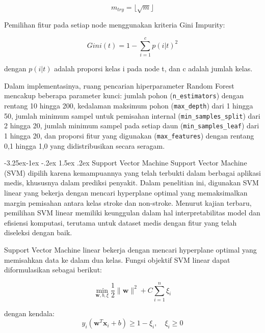 \documentclass[10pt]{article}
\makeatletter
\renewcommand\subsubsection{\@startsection{subsubsection}{3}{\z@}%
  {-3.25ex\@plus -1ex \@minus -.2ex}%
  {1.5ex \@plus .2ex}%
  {\normalfont\itshape\normalsize}}
\makeatother
\begin{document}
\begin{multicols}{2}
    \begin{equation}
        m_{try} = \lfloor\sqrt{m}\rfloor
    \end{equation}

    Pemilihan fitur pada setiap node menggunakan kriteria Gini Impurity:

    \begin{equation}
        Gini(t) = 1 - \sum_{i=1}^{c}p(i|t)^2
    \end{equation}

    dengan $p(i|t)$ adalah proporsi kelas i pada node t, dan c adalah jumlah kelas.

    Dalam implementasinya, ruang pencarian hiperparameter Random Forest mencakup
    beberapa parameter kunci: jumlah pohon (\texttt{n\_estimators}) dengan rentang
    10 hingga 200, kedalaman maksimum pohon (\texttt{max\_depth}) dari 1 hingga 50,
    jumlah minimum sampel untuk pemisahan internal (\texttt{min\_samples\_split})
    dari 2 hingga 20, jumlah minimum sampel pada setiap daun
    (\texttt{min\_samples\_leaf}) dari 1 hingga 20, dan proporsi fitur yang
    digunakan (\texttt{max\_features}) dengan rentang 0,1 hingga 1,0 yang
    didistribusikan secara seragam.

    \subsubsection{Support Vector Machine}
    Support Vector Machine (SVM) dipilih karena kemampuannya yang telah terbukti
    dalam berbagai aplikasi medis, khususnya dalam prediksi
    penyakit\cite{pisner2020support}. Dalam penelitian ini, digunakan SVM linear
    yang bekerja dengan mencari hyperplane optimal yang memaksimalkan margin
    pemisahan antara kelas stroke dan non-stroke. Menurut kajian
    terbaru\cite{bhavsar2021comprehensive}, pemilihan SVM linear memiliki
    keunggulan dalam hal interpretabilitas model dan efisiensi komputasi, terutama
    untuk dataset medis dengan fitur yang telah diseleksi dengan baik.

    Support Vector Machine linear bekerja dengan mencari hyperplane optimal yang
    memisahkan data ke dalam dua kelas. Fungsi objektif SVM linear dapat
    diformulasikan sebagai berikut:

    \begin{equation}
        \min_{\mathbf{w},b,\xi} \frac{1}{2}\|\mathbf{w}\|^2 + C\sum_{i=1}^{n}\xi_i
    \end{equation}

    dengan kendala:
    \begin{equation}
        y_i(\mathbf{w}^T\mathbf{x}_i + b) \geq 1 - \xi_i, \quad \xi_i \geq 0
    \end{equation}


\end{multicols}
\end{document}

